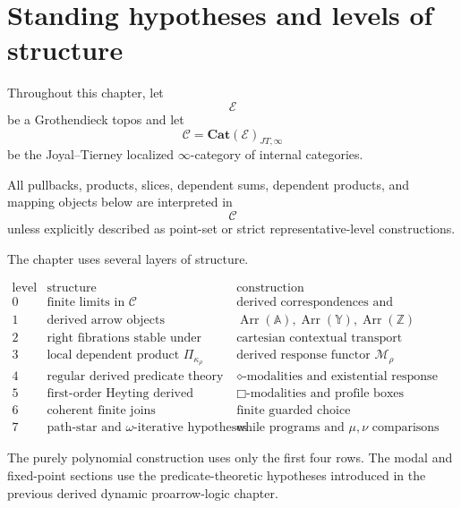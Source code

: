 \section{Standing hypotheses and levels of structure}
\label{sec:derived-poly-standing-hypotheses}

Throughout this chapter, let
\[
\mathcal E
\]
be a Grothendieck topos and let
\[
\mathcal C
=
\mathbf{Cat}(\mathcal E)_{JT,\infty}
\]
be the Joyal--Tierney localized \(\infty\)-category of internal categories.

All pullbacks, products, slices, dependent sums, dependent products, and
mapping objects below are interpreted in
\[
\mathcal C
\]
unless explicitly described as point-set or strict representative-level
constructions.

The chapter uses several layers of structure.

\begin{center}
\[
\begin{array}{c|c|c}
\text{level} & \text{structure} & \text{construction} \\
\hline
0 & \text{finite limits in }\mathcal C &
\text{derived correspondences and contextual execution} \\
1 & \text{derived arrow objects} &
\operatorname{Arr}(\mathbb A),\operatorname{Arr}(\mathbb Y),
\operatorname{Arr}(\mathbb Z) \\
2 & \text{right fibrations stable under pullback and composition} &
\text{cartesian contextual transport} \\
3 & \text{local dependent product }\Pi_{\kappa_\rho} &
\text{derived response functor }\mathcal M_\rho \\
4 & \text{regular derived predicate theory} &
\diamond\text{-modalities and existential response liftings} \\
5 & \text{first-order Heyting derived predicate theory} &
\Box\text{-modalities and profile boxes} \\
6 & \text{coherent finite joins} &
\text{finite guarded choice} \\
7 & \text{path-star and }\omega\text{-iterative hypotheses} &
\text{while programs and }\mu,\nu\text{ comparisons}
\end{array}
\]
\end{center}

The purely polynomial construction uses only the first four rows.  The modal
and fixed-point sections use the predicate-theoretic hypotheses introduced in
the previous derived dynamic proarrow-logic chapter.

